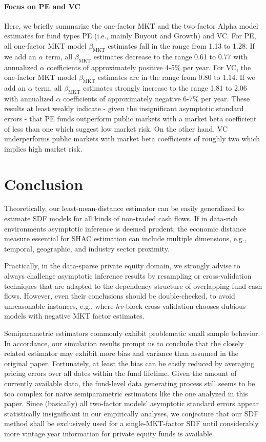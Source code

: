 \documentclass[12pt]{article}
\begin{document}
\paragraph{Focus on PE and VC}

Here, we briefly summarize the one-factor MKT and the two-factor Alpha model estimates for fund types PE (i.e., mainly Buyout and Growth) and VC.
For PE, all one-factor MKT model $\beta_{\mathrm{MKT}}$ estimates fall in the range from 1.13 to 1.28. 
If we add an $\alpha$ term, all $\beta_{\mathrm{MKT}}$ estimates decrease to the range 0.61 to 0.77 with annualized $\alpha$ coefficients of approximately positive 4-5\% per year.
For VC, the one-factor MKT model $\beta_{\mathrm{MKT}}$ estimates are in the range from 0.80 to 1.14.
If we add an $\alpha$ term, all $\beta_{\mathrm{MKT}}$ estimates strongly increase to the range 1.81 to 2.06 with annualized $\alpha$ coefficients of approximately negative 6-7\% per year.
These results at least weakly indicate - given the insignificant asymptotic standard errors - that PE funds outperform public markets with a market beta coefficient of less than one which suggest low market risk.
On the other hand, VC underperforms public markets with market beta coefficients of roughly two which implies high market risk.


\section{Conclusion}
\label{sec:conclusion}

Theoretically, our least-mean-distance estimator can be easily generalized to estimate SDF models for all kinds of non-traded cash flows.
If in data-rich environments asymptotic inference is deemed prudent, the economic distance measure essential for SHAC estimation can include multiple dimensions, e.g., temporal, geographic, and industry sector proximity.

Practically, in the data-sparse private equity domain, we strongly advise to always challenge asymptotic inference results by resampling or cross-validation techniques that are adapted to the dependency structure of overlapping fund cash flows.
However, even their conclusions should be double-checked, to avoid unreasonable instances,  e.g., where $hv$-block cross-validation chooses  dubious models with negative MKT factor estimates.

Semiparametric estimators commonly exhibit problematic small sample behavior.
In accordance, our simulation results prompt us to conclude that the closely related \cite{DLP12} estimator may exhibit more bias and variance than assumed in the original paper.
Fortunately, at least the bias can be easily reduced by averaging pricing errors over all dates within the fund lifetime.
Given the amount of currently available data, the fund-level data generating process still seems to be too complex for naive semiparametric estimators like the one analyzed in this paper. 
Since (basically) all two-factor models' asymptotic standard errors appear statistically insignificant in our empirically analyses, we conjecture that our SDF method shall be exclusively used for a single-MKT-factor SDF until considerably more vintage year information for private equity funds is available.
\end{document}

